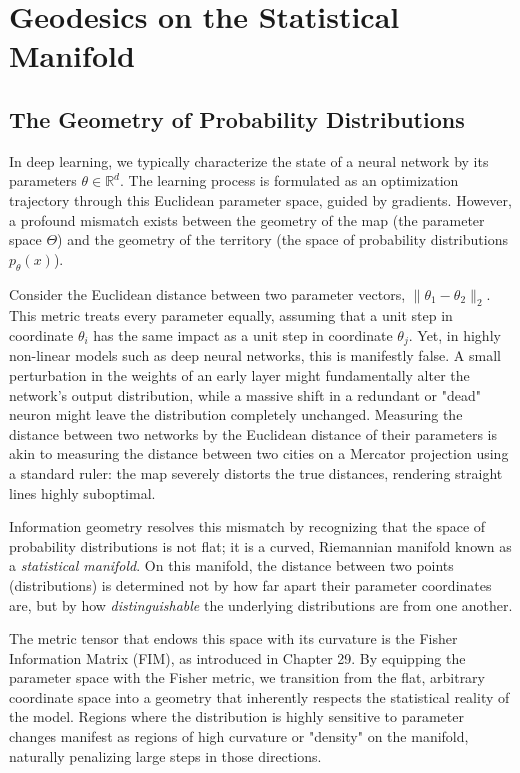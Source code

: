 \chapter{Geodesics on the Statistical Manifold}
\label{ch:geodesics}

\section{The Geometry of Probability Distributions}

In deep learning, we typically characterize the state of a neural network by its parameters $\theta \in \mathbb{R}^d$. The learning process is formulated as an optimization trajectory through this Euclidean parameter space, guided by gradients. However, a profound mismatch exists between the geometry of the map (the parameter space $\Theta$) and the geometry of the territory (the space of probability distributions $p_\theta(x)$). 

Consider the Euclidean distance between two parameter vectors, $\|\theta_1 - \theta_2\|_2$. This metric treats every parameter equally, assuming that a unit step in coordinate $\theta_i$ has the same impact as a unit step in coordinate $\theta_j$. Yet, in highly non-linear models such as deep neural networks, this is manifestly false. A small perturbation in the weights of an early layer might fundamentally alter the network's output distribution, while a massive shift in a redundant or "dead" neuron might leave the distribution completely unchanged. Measuring the distance between two networks by the Euclidean distance of their parameters is akin to measuring the distance between two cities on a Mercator projection using a standard ruler: the map severely distorts the true distances, rendering straight lines highly suboptimal.

Information geometry resolves this mismatch by recognizing that the space of probability distributions is not flat; it is a curved, Riemannian manifold known as a \textit{statistical manifold}. On this manifold, the distance between two points (distributions) is determined not by how far apart their parameter coordinates are, but by how \textit{distinguishable} the underlying distributions are from one another. 

The metric tensor that endows this space with its curvature is the Fisher Information Matrix (FIM), as introduced in Chapter 29. By equipping the parameter space with the Fisher metric, we transition from the flat, arbitrary coordinate space into a geometry that inherently respects the statistical reality of the model. Regions where the distribution is highly sensitive to parameter changes manifest as regions of high curvature or "density" on the manifold, naturally penalizing large steps in those directions. 

